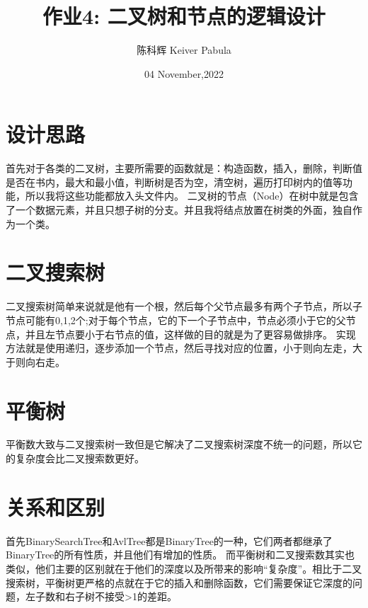 \documentclass{ctexart}
\title{作业4: 二叉树和节点的逻辑设计}
\author{陈科辉 Keiver Pabula}
\date{04 November,2022}
\begin{document}
\maketitle

\section{设计思路}
  首先对于各类的二叉树，主要所需要的函数就是：构造函数，插入，删除，判断值是否在书内，最大和最小值，判断树是否为空，清空树，遍历打印树内的值等功能，所以我将这些功能都放入头文件内。
  二叉树的节点（Node）在树中就是包含了一个数据元素，并且只想子树的分支。并且我将结点放置在树类的外面，独自作为一个类。

\section{二叉搜索树}
  二叉搜索树简单来说就是他有一个根，然后每个父节点最多有两个子节点，所以子节点可能有0,1,2个;对于每个节点，它的下一个子节点中，节点必须小于它的父节点，并且左节点要小于右节点的值，这样做的目的就是为了更容易做排序。 实现方法就是使用递归，逐步添加一个节点，然后寻找对应的位置，小于则向左走，大于则向右走。
\section{平衡树}
  平衡数大致与二叉搜索树一致但是它解决了二叉搜索树深度不统一的问题，所以它的复杂度会比二叉搜索数更好。
\section{关系和区别}
首先BinarySearchTree和AvlTree都是BinaryTree的一种，它们两者都继承了BinaryTree的所有性质，并且他们有增加的性质。
而平衡树和二叉搜索数其实也类似，他们主要的区别就在于他们的深度以及所带来的影响“复杂度”。相比于二叉搜索树，平衡树更严格的点就在于它的插入和删除函数，它们需要保证它深度的问题，左子数和右子树不接受>1的差距。
\end{document}
